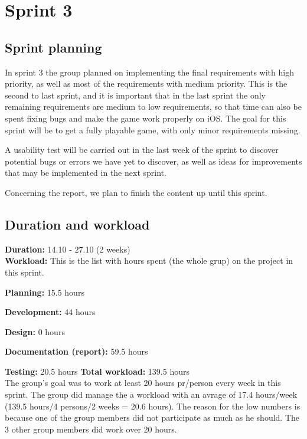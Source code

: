 \section{Sprint 3}

\subsection{Sprint planning}
	In sprint 3 the group planned on implementing the final requirements with high priority, as well as most of the requirements with medium priority. This is the second to last sprint, and it is important that in the last sprint the  only remaining requirements are medium to low requirements, so that time can also be spent fixing bugs and make the game work properly on iOS. The goal for this sprint will be to get a fully playable game, with only minor requirements missing.

	A usability test will be carried out in the last week of the sprint to discover potential bugs or errors we have yet to discover, as well as ideas for improvements that may be implemented in the next sprint.

	Concerning the report, we plan to finish the content up until this sprint.

\subsection{Duration and workload}

	{\bf Duration:} 14.10 - 27.10 (2 weeks)\\
	{\bf Workload:} This is the list with hours spent (the whole grup) on the project in this sprint.
		\item {\bf Planning:} 15.5 hours
		\item {\bf Development:} 44 hours
		\item {\bf Design:} 0 hours
		\item {\bf Documentation (report):} 59.5 hours
		\item {\bf Testing:} 20.5 hours 
	{\bf Total workload: } 139.5 hours \\

	The group's goal was to work at least 20 hours pr/person every week in this sprint. 
	The group did manage the a workload with an avrage of 17.4 hours/week (139.5 hours/4 persons/2 weeks = 20.6 hours). The reason for the low numbers is because one of the group members did not
	participate as much as he should. The 3 other group members did work over 20 hours. 


